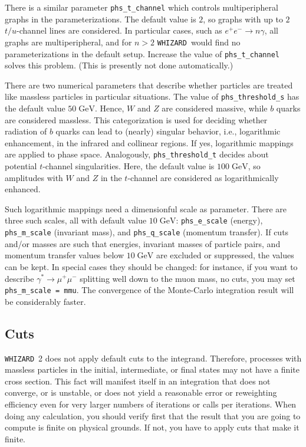 \documentclass[12pt]{book}
\newcommand{\whizard}{\texttt{WHIZARD}}
\newcommand{\GeV}{\textrm{GeV}}
\begin{document}
There is a similar parameter \verb|phs_t_channel| which controls
multiperipheral graphs in the parameterizations.  The default value is $2$, so
graphs with up to $2$ $t/u$-channel lines are considered.  In particular
cases, such as $e^+e^-\to n\gamma$, all graphs are multiperipheral, and for
$n>2$ \whizard\ would find no parameterizations in the default setup.
Increase the value of \verb|phs_t_channel| solves this problem.  (This is
presently not done automatically.)

There are two numerical parameters that describe whether particles are treated
like massless particles in particular situations.  The value of
\verb|phs_threshold_s| has the default value $50\;\GeV$.  Hence, $W$ and $Z$
are considered massive, while $b$ quarks are considered massless.  This
categorization is used for deciding whether radiation of $b$ quarks can lead
to (nearly) singular behavior, i.e., logarithmic enhancement, in the infrared
and collinear regions.  If yes, logarithmic mappings are applied to phase
space.  Analogously, \verb|phs_threshold_t| decides about potential
$t$-channel singularities.  Here, the default value is $100\;\GeV$, so
amplitudes with $W$ and $Z$ in the $t$-channel are considered as
logarithmically enhanced.

Such logarithmic mappings need a dimensionful scale as parameter.  There are
three such scales, all with default value $10\;\GeV$: \verb|phs_e_scale|
(energy), \verb|phs_m_scale| (invariant mass), and \verb|phs_q_scale|
(momentum transfer).  If cuts and/or masses are such that energies, invariant
masses of particle pairs, and momentum transfer values below $10\;\GeV$ are
excluded or suppressed, the values can be kept.  In special cases they should
be changed: for instance, if you want to describe $\gamma^*\to\mu^+\mu^-$
splitting well down to the muon mass, no cuts, you may set
\verb|phs_m_scale = mmu|.  The convergence of the Monte-Carlo integration
result will be considerably faster.


\subsection{Cuts}

\whizard~2 does not apply default cuts to the integrand.  Therefore, processes
with massless particles in the initial, intermediate, or final states may not
have a finite cross section.  This fact will manifest itself in an integration
that does not converge, or is unstable, or does not yield a reasonable error
or reweighting efficiency even for very larger numbers of iterations or calls
per iterations.  When doing any calculation, you should verify first that the
result that you are going to compute is finite on physical grounds.  If not,
you have to apply cuts that make it finite.
\end{document}
